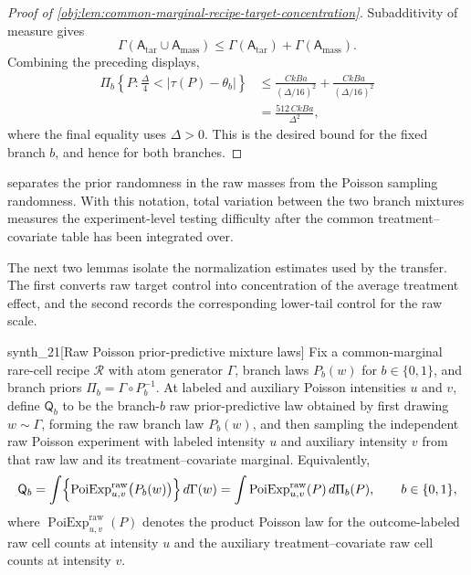 \documentclass[11pt]{article}
\begin{document}
\begin{proof}[Proof of \cref{obj:lem:common-marginal-recipe-target-concentration}]
Subadditivity of measure gives
\[
\Gamma(\mathsf A_{\mathrm{tar}}\cup\mathsf A_{\mathrm{mass}})
\le
\Gamma(\mathsf A_{\mathrm{tar}})+\Gamma(\mathsf A_{\mathrm{mass}}).
\]
Combining the preceding displays,
\[
\begin{aligned}
\Pi_b\!\left\{P:\frac{\Delta}{4}<|\tau(P)-\theta_b|\right\}
&\le
\frac{CkBa}{(\Delta/16)^2}
+
\frac{CkBa}{(\Delta/16)^2}  \\
&=
\frac{512\,CkBa}{\Delta^2},
\end{aligned}
\]
where the final equality uses \(\Delta>0\).  This is the desired bound for the fixed branch \(b\), and hence for both branches.
\end{proof}

 separates the prior randomness in the raw masses from the Poisson sampling randomness. With this notation, total variation between the two branch mixtures measures the experiment-level testing difficulty after the common treatment--covariate table has been integrated over.

The next two lemmas isolate the normalization estimates used by the transfer. The first converts raw target control into concentration of the average treatment effect, and the second records the corresponding lower-tail control for the raw scale.

\begin{definitionv}{synth_21}[Raw Poisson prior-predictive mixture laws]
Fix a common-marginal rare-cell recipe \(\mathcal R\) with atom generator \(\Gamma\), branch laws \(P_b(w)\) for \(b\in\{0,1\}\), and branch priors \(\Pi_b=\Gamma\circ P_b^{-1}\). At labeled and auxiliary Poisson intensities \(u\) and \(v\), define \(\mathsf Q_b\) to be the branch-\(b\) raw prior-predictive law obtained by first drawing \(w\sim\Gamma\), forming the raw branch law \(P_b(w)\), and then sampling the independent raw Poisson experiment with labeled intensity \(u\) and auxiliary intensity \(v\) from that raw law and its treatment--covariate marginal. Equivalently,
\[
\mathsf Q_b
=
\int
\Bigl\{
\operatorname{PoiExp}_{u,v}^{\mathrm{raw}}\bigl(P_b(w)\bigr)
\Bigr\}\,d\Gamma(w)
=
\int
\operatorname{PoiExp}_{u,v}^{\mathrm{raw}}(P)\,d\Pi_b(P),
\qquad b\in\{0,1\},
\]
where \(\operatorname{PoiExp}_{u,v}^{\mathrm{raw}}(P)\) denotes the product Poisson law for the outcome-labeled raw cell counts at intensity \(u\) and the auxiliary treatment--covariate raw cell counts at intensity \(v\).
\end{definitionv}
\end{document}
